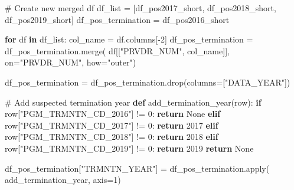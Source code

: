 \documentclass[
  letterpaper,
  DIV=11,
  numbers=noendperiod]{scrartcl}
\newenvironment{Shaded}{\begin{snugshade}}{\end{snugshade}}
\newcommand{\BuiltInTok}[1]{\textcolor[rgb]{0.00,0.23,0.31}{#1}}
\newcommand{\CommentTok}[1]{\textcolor[rgb]{0.37,0.37,0.37}{#1}}
\newcommand{\ControlFlowTok}[1]{\textcolor[rgb]{0.00,0.23,0.31}{\textbf{#1}}}
\newcommand{\DecValTok}[1]{\textcolor[rgb]{0.68,0.00,0.00}{#1}}
\newcommand{\KeywordTok}[1]{\textcolor[rgb]{0.00,0.23,0.31}{\textbf{#1}}}
\newcommand{\NormalTok}[1]{\textcolor[rgb]{0.00,0.23,0.31}{#1}}
\newcommand{\OperatorTok}[1]{\textcolor[rgb]{0.37,0.37,0.37}{#1}}
\newcommand{\StringTok}[1]{\textcolor[rgb]{0.13,0.47,0.30}{#1}}
\newcommand{\VariableTok}[1]{\textcolor[rgb]{0.07,0.07,0.07}{#1}}
\begin{document}
\begin{Shaded}
\begin{Highlighting}[]
\CommentTok{\# Create new merged df}
\NormalTok{df\_list }\OperatorTok{=}\NormalTok{ [df\_pos2017\_short, df\_pos2018\_short, df\_pos2019\_short]}
\NormalTok{df\_pos\_termination }\OperatorTok{=}\NormalTok{ df\_pos2016\_short}

\ControlFlowTok{for}\NormalTok{ df }\KeywordTok{in}\NormalTok{ df\_list:}
\NormalTok{    col\_name }\OperatorTok{=}\NormalTok{ df.columns[}\OperatorTok{{-}}\DecValTok{2}\NormalTok{]}
\NormalTok{    df\_pos\_termination }\OperatorTok{=}\NormalTok{ df\_pos\_termination.merge(}
\NormalTok{        df[[}\StringTok{"PRVDR\_NUM"}\NormalTok{, col\_name]], on}\OperatorTok{=}\StringTok{"PRVDR\_NUM"}\NormalTok{, how}\OperatorTok{=}\StringTok{"outer"}\NormalTok{)}

\NormalTok{df\_pos\_termination }\OperatorTok{=}\NormalTok{ df\_pos\_termination.drop(columns}\OperatorTok{=}\NormalTok{[}\StringTok{"DATA\_YEAR"}\NormalTok{])}
\end{Highlighting}
\end{Shaded}

\begin{Shaded}
\begin{Highlighting}[]
\CommentTok{\# Add suspected termination year}
\KeywordTok{def}\NormalTok{ add\_termination\_year(row):}
    \ControlFlowTok{if}\NormalTok{ row[}\StringTok{"PGM\_TRMNTN\_CD\_2016"}\NormalTok{] }\OperatorTok{!=} \DecValTok{0}\NormalTok{:}
        \ControlFlowTok{return} \VariableTok{None}
    \ControlFlowTok{elif}\NormalTok{ row[}\StringTok{"PGM\_TRMNTN\_CD\_2017"}\NormalTok{] }\OperatorTok{!=} \DecValTok{0}\NormalTok{:}
        \ControlFlowTok{return} \DecValTok{2017}
    \ControlFlowTok{elif}\NormalTok{ row[}\StringTok{"PGM\_TRMNTN\_CD\_2018"}\NormalTok{] }\OperatorTok{!=} \DecValTok{0}\NormalTok{:}
        \ControlFlowTok{return} \DecValTok{2018}
    \ControlFlowTok{elif}\NormalTok{ row[}\StringTok{"PGM\_TRMNTN\_CD\_2019"}\NormalTok{] }\OperatorTok{!=} \DecValTok{0}\NormalTok{:}
        \ControlFlowTok{return} \DecValTok{2019}
    \ControlFlowTok{return} \VariableTok{None}


\NormalTok{df\_pos\_termination[}\StringTok{"TRMNTN\_YEAR"}\NormalTok{] }\OperatorTok{=}\NormalTok{ df\_pos\_termination.}\BuiltInTok{apply}\NormalTok{(}
\NormalTok{    add\_termination\_year, axis}\OperatorTok{=}\DecValTok{1}\NormalTok{)}
\end{Highlighting}
\end{Shaded}
\end{document}
